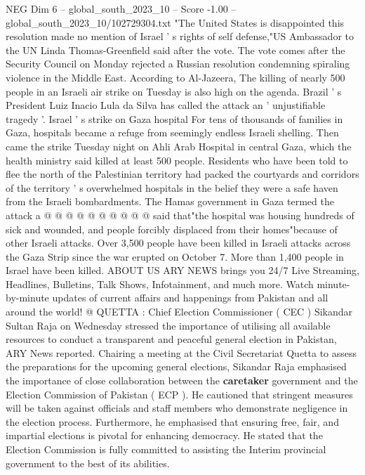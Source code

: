 \begin{textsample}{NEG Dim 6 – global\_south\_2023\_10 – Score -1.00 – global\_south\_2023\_10/102729304.txt}  \label{ex:f6_neg_153}
"The United States is disappointed this resolution made no mention of Israel ' s rights of self defense,"US Ambassador to the UN Linda Thomas-Greenfield said after the vote.
The vote comes after the Security Council on Monday rejected a Russian resolution condemning spiraling violence in the Middle East.
According to Al-Jazeera, The killing of nearly 500 people in an Israeli air strike on Tuesday is also high on the agenda.
Brazil ' s President Luiz Inacio Lula da Silva has called the attack an ' unjustifiable tragedy '.
Israel ' s strike on Gaza hospital For tens of thousands of families in Gaza, hospitals became a refuge from seemingly endless Israeli shelling.
Then came the strike Tuesday night on Ahli Arab Hospital in central Gaza, which the health ministry said killed at least 500 people.
Residents who have been told to flee the north of the Palestinian territory had packed the courtyards and corridors of the territory ' s overwhelmed hospitals in the belief they were a safe haven from the Israeli bombardments.
The Hamas government in Gaza termed the attack a @ @ @ @ @ @ @ @ @ @ said that"the hospital was housing hundreds of sick and wounded, and people forcibly displaced from their homes"because of other Israeli attacks.
Over 3,500 people have been killed in Israeli attacks across the Gaza Strip since the war erupted on October 7.
More than 1,400 people in Israel have been killed.
ABOUT US ARY NEWS brings you 24/7 Live Streaming, Headlines, Bulletins, Talk Shows, Infotainment, and much more.
Watch minute-by-minute updates of current affairs and happenings from Pakistan and all around the world! @ QUETTA : Chief Election Commissioner ( CEC ) Sikandar Sultan Raja on Wednesday stressed the importance of utilising all available resources to conduct a transparent and peaceful general election in Pakistan, ARY News reported.
Chairing a meeting at the Civil Secretariat Quetta to assess the preparations for the upcoming general elections, Sikandar Raja emphasised the importance of close collaboration between the \textbf{caretaker} government and the Election Commission of Pakistan ( ECP ).
He cautioned that stringent measures will be taken against officials and staff members who demonstrate negligence in the election process.
Furthermore, he emphasised that ensuring free, fair, and impartial elections is pivotal for enhancing democracy.
He stated that the Election Commission is fully committed to assisting the Interim provincial government to the best of its abilities.

\end{textsample}

